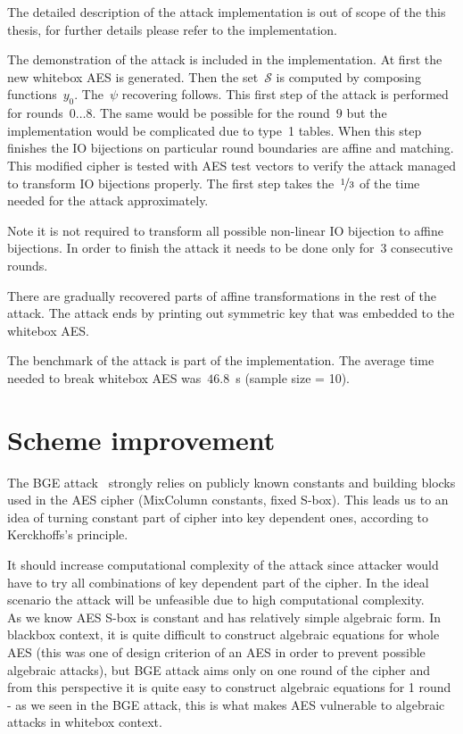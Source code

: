 \documentclass[11pt,oneside,final]{fithesis2}
\begin{document}
    The detailed description of the attack implementation is out of scope of the this thesis, for further details please refer to the implementation.

    The demonstration of the attack is included in the implementation. At first the new whitebox AES is generated. Then the set~$\mathcal{S}$ is computed
    by composing functions~$y_0$. The~$\psi$ recovering follows. This first step of the attack is performed for rounds~$0\dots8$. The same would be possible for 
    the round~$9$ but the implementation would be complicated due to type~1 tables. When this step finishes the IO bijections on particular round boundaries
    are affine and matching. This modified cipher is tested with AES test vectors to verify the attack managed to transform IO bijections properly. 
    The first step takes the~$\nicefrac{1}{3}$ of the time needed for the attack approximately.
    
    Note it is not required to transform all possible non-linear IO bijection to affine bijections. In order to finish the attack it needs to be done only for~3 consecutive rounds.
    
    There are gradually recovered parts of affine transformations in the rest of the attack. The attack ends by printing out symmetric key that was embedded to the whitebox AES.
    
    The benchmark of the attack is part of the implementation. The average time needed to break whitebox AES was~$46.8$~s (sample size = 10).
    
    \chapter{Scheme improvement}
    The BGE attack~\citep{Billet:2004:CWB:2080787.2080809} strongly relies on publicly known constants and building blocks used in the AES cipher (MixColumn constants, fixed S-box). 
    This leads us to an idea of turning constant part of cipher into key dependent ones, according to Kerckhoffs's principle. 

    It should increase computational complexity of the attack since attacker would have to try
    all combinations of key dependent part of the cipher. In the ideal scenario the attack will be unfeasible due to high computational complexity. \\
    
    As we know AES S-box is constant and has relatively simple algebraic form. In blackbox context, it is quite difficult to construct algebraic equations for whole AES (this was 
    one of design criterion of an AES in order to prevent possible algebraic attacks), but BGE attack aims only on one round of the cipher and from this perspective it is 
    quite easy to construct algebraic equations for 1 round - as we seen in the BGE attack, this is what makes AES vulnerable to algebraic attacks in whitebox context.\\
    
\end{document}
